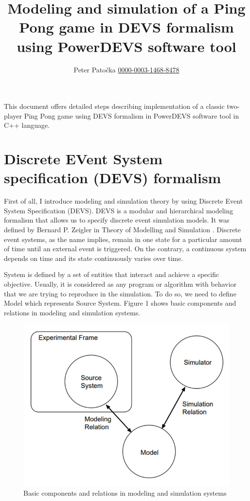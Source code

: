 \documentclass[fleqn,10pt]{olplainarticle}
\title{Modeling and simulation of a Ping Pong game in DEVS formalism using PowerDEVS software tool}
\author[1]{Peter Patočka {\tiny \href{ https://orcid.org/0000-0003-1468-8478}{\scshape 0000-0003-1468-8478}}}
\affil[1]{Department of Intelligent Systems, University of Technology, Brno, Czech Republic}
\begin{document}
\flushbottom
\maketitle
\thispagestyle{empty}

\vskip10pt

This document offers detailed steps describing implementation of a classic two-player Ping Pong game using DEVS formalism in PowerDEVS software tool in C++ language.

\section{Discrete EVent System specification (DEVS) formalism}

\vskip10pt

First of all, I introduce modeling and simulation theory by using Discrete Event System Specification (DEVS). DEVS is a modular and hierarchical modeling formalism that allows us to specify discrete event simulation models. It was defined by Bernard P. Zeigler in Theory of Modelling and Simulation \citep{zeigler1976theory}. Discrete event systems, as the name implies, remain in one state for a particular amount of time until an external event is triggered. On the contrary, a continuous system depends on time and its state continuously varies over time.

\vskip10pt

System is defined by a set of entities that interact and achieve a specific objective. Usually, it is considered as any program or algorithm with behavior that we are trying to reproduce in the simulation. To do so, we need to define Model which represents Source System. Figure 1 shows basic components and relations in modeling and simulation systems.

\begin{figure}[ht]
\centering
\includegraphics[width=0.7\linewidth]{images/1-modelling-and-simulation.jpg}
\caption{Basic components and relations in modeling and simulation systems\citep{FITPUB9905}}
\label{fig:figure1}
\end{figure}
\end{document}
